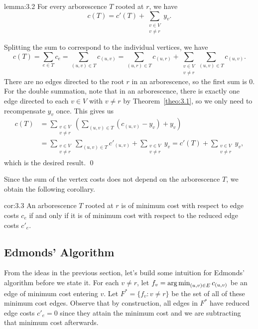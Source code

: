 \begin{lemma}{lemma:3.2}
    For every arborescence $T$ rooted at $r$, we have 
    \[ c(T) = c'(T) + \sum_{\substack{v\in V \\ v\neq r}} y_v. \] 
\end{lemma}\vspace{-0.15cm}
\begin{pf}
    Splitting the sum to correspond to the individual vertices, we have 
    \[ c(T) = \sum_{e\in T} c_e = \sum_{(u, v) \in T} c_{(u,v)} 
    = \sum_{(u, r) \in T} c_{(u,r)} + \sum_{\substack{v\in V\\ v\neq r}} 
    \sum_{(u, v) \in T} c_{(u, v)}. \] 
    There are no edges directed to the root $r$ in an arborescence, so 
    the first sum is $0$. For the double summation, note that in an 
    arborescence, there is exactly one edge directed to each $v \in V$ 
    with $v \neq r$ by Theorem~\ref{theo:3.1}, so we only need to recompensate 
    $y_v$ once. This gives us 
    \begin{align*}
        c(T) &= \sum_{\substack{v\in V\\ v \neq r}} \left( \sum_{(u, v) \in T} (c_{(u, v)} - y_v) + y_v \right) \\
        &= \sum_{\substack{v\in V\\ v \neq r}} \sum_{(u, v) \in T} c'_{(u,v)} + \sum_{\substack{v\in V\\ v \neq r}} y_v 
        = c'(T) + \sum_{\substack{v\in V\\ v \neq r}} y_v,
    \end{align*}
    which is the desired result. \qed
\end{pf}

Since the sum of the vertex costs does not depend on the arborescence 
$T$, we obtain the following corollary. 

\begin{cor}{cor:3.3}
    An arborescence $T$ rooted at $r$ is of minimum cost with respect to 
    edge costs $c_e$ if and only if it is of minimum cost with respect 
    to the reduced edge costs $c'_e$. 
\end{cor}

\subsection{Edmonds' Algorithm}
From the ideas in the previous section, let's build
some intuition for Edmonds' algorithm before we state it. For each $v \neq r$, 
let $f_v = \operatorname*{arg\,min}_{(u, v) \in E} c_{(u, v)}$ be an edge of minimum cost 
entering $v$. Let $F^* = \{f_v : v \neq r\}$ be the set of all of these 
minimum cost edges. Observe that by construction, all edges in $F^*$ have 
reduced edge costs $c'_e = 0$ since they attain the minimum cost 
and we are subtracting that minimum cost afterwards.

